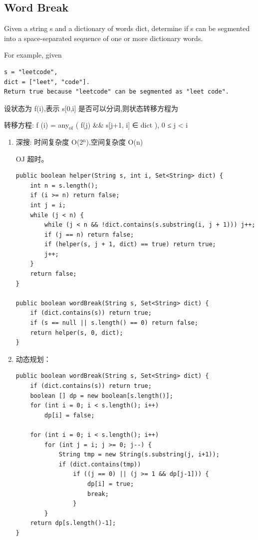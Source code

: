 \documentclass[12pt]{book}
\begin{document}
\subsection{Word Break}
\label{sec-14-2-10}
Given a string s and a dictionary of words dict, determine if s can be segmented into a space-separated sequence of one or more dictionary words.

For example, given
\lstset{language=java,label= ,caption= ,numbers=none}
\begin{lstlisting}
s = "leetcode",
dict = ["leet", "code"].
Return true because "leetcode" can be segmented as "leet code".
\end{lstlisting}

设状态为 f(i),表示 s[0,i] 是否可以分词,则状态转移方程为

转移方程: f (i) = any$_{\text{of}}$ ( f(j) \&\& s[j+1, i] ∈ dict ), 0 ≤ j < i
\begin{enumerate}
\item 深搜: 时间复杂度 O(2$^{\text{n}}$),空间复杂度 O(n)
\label{sec-14-2-10-1}

OJ 超时。
\lstset{language=java,label= ,caption= ,numbers=none}
\begin{lstlisting}
public boolean helper(String s, int i, Set<String> dict) {
    int n = s.length();
    if (i >= n) return false;
    int j = i;
    while (j < n) {
        while (j < n && !dict.contains(s.substring(i, j + 1))) j++;
        if (j == n) return false;
        if (helper(s, j + 1, dict) == true) return true;
        j++;
    }
    return false;
}

public boolean wordBreak(String s, Set<String> dict) {
    if (dict.contains(s)) return true;
    if (s == null || s.length() == 0) return false;
    return helper(s, 0, dict);
}
\end{lstlisting}
\item 动态规划：
\label{sec-14-2-10-2}
\lstset{language=java,label= ,caption= ,numbers=none}
\begin{lstlisting}
public boolean wordBreak(String s, Set<String> dict) {
    if (dict.contains(s)) return true;
    boolean [] dp = new boolean[s.length()];
    for (int i = 0; i < s.length(); i++) 
        dp[i] = false;

    for (int i = 0; i < s.length(); i++)
        for (int j = i; j >= 0; j--) {
            String tmp = new String(s.substring(j, i+1));
            if (dict.contains(tmp))
                if ((j == 0) || (j >= 1 && dp[j-1])) {
                    dp[i] = true;
                    break;
                }
        }
    return dp[s.length()-1];
}
\end{lstlisting}
\end{enumerate}
\end{document}
